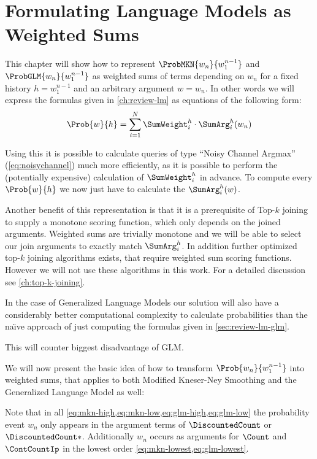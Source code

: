\chapter{Formulating Language Models as Weighted Sums}
\label{ch:weightedsum}

This chapter will show how to represent  $\ProbMKN{w_n}{w_1^{n-1}}$ and
$\ProbGLM{w_n}{w_1^{n-1}}$ as weighted sums of terms depending on $w_n$ for a
fixed history $h = w_1^{n-1}$ and an  arbitrary argument $w = w_n$.
In other words we will express the formulas given in \cref{ch:review-lm} as
equations of the following form:
\begin{equation}
  \Prob{w}{h} = \sum_{i = 1}^{N} \SumWeight_i^h \cdot \SumArg_i^h(w_n)
\end{equation}

Using this it is possible to calculate queries of type ``Noisy Channel Argmax''
(\cref{eq:noisychannel}) much more efficiently, as it is possible to perform the
(potentially expensive) calculation of $\SumWeight_i^h$ in advance.
To compute every $\Prob{w}{h}$ we now just have to calculate the
$\SumArg_i^h(w)$.

Another benefit of this representation is that it is a prerequisite of Top-$k$
joining to supply a monotone scoring function, which only depends on the
joined arguments.
Weighted sums are trivially monotone  and we will be able to
select our join arguments to exactly match $\SumArg_i^h$.
In addition further optimized top-$k$ joining algorithms exists, that require
weighted sum scoring functions.
However we will not use these algorithms in this work.
For a detailed discussion see \cref{ch:top-k-joining}.

In the case of Generalized Language Models our solution will also have a
considerably better computational complexity to calculate probabilities than the
na{\"\i}ve approach of just computing the formulas given in
\cref{sec:review-lm-glm}.
\begin{draft}
This will counter biggest disadvantage of GLM.
\end{draft}

We will now present the basic idea of how to transform $\Prob{w_n}{w_1^{n-1}}$
into weighted sums, that applies to both Modified Kneser-Ney Smoothing and
the Generalized Language Model as well:

Note that in all \cref{eq:mkn-high,eq:mkn-low,eq:glm-high,eq:glm-low} the
probability event $w_n$ only appears in the argument terms of
$\DiscountedCount$ or $\DiscountedCount*$.
Additionally $w_n$ occurs as arguments for $\Count$ and $\ContCountIp$ in the
lowest order \cref{eq:mkn-lowest,eq:glm-lowest}.

